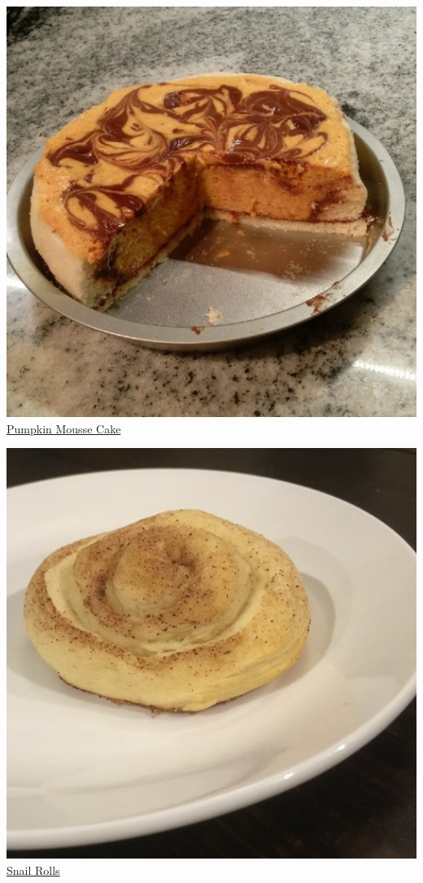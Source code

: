 \documentclass[
]{book}
\begin{document}
\protect\hyperlink{pumpkincake}{\includegraphics[width=1\textwidth,height=\textheight]{pumpkin_mousse_cake_small.jpg}}
\protect\hyperlink{pumpkincake}{Pumpkin Mousse Cake}

\protect\hyperlink{snailroll}{\includegraphics[width=1\textwidth,height=\textheight]{snail_roll_small.jpg}}
\protect\hyperlink{snailroll}{Snail Rolls}
\end{document}
